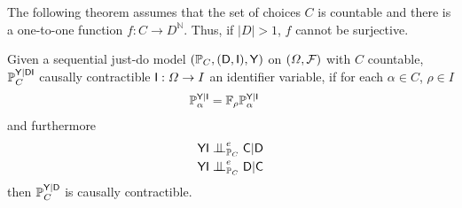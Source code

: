 The following theorem assumes that the set of choices $C$ is countable and there is a one-to-one function $f:C\to D^{\mathbb{N}}$. Thus, if $|D|>1$, $f$ cannot be surjective.

\begin{theorem}\label{th:cc_ind_treat}
Given a sequential just-do model $(\mathbb{P}_C,(\mathsf{D},\mathsf{I}),\mathsf{Y})$ on $(\Omega,\mathcal{F})$ with $C$ countable, $\mathbb{P}_C^{\mathsf{Y}|\mathsf{DI}}$ causally contractible $\mathsf{I}:\Omega\to I$ an identifier variable, if for each $\alpha\in C$, $\rho\in I$
\begin{align}
    \mathbb{P}_\alpha^{\mathsf{Y}|\mathsf{I}} &= \mathbb{F}_{\rho}\mathbb{P}_\alpha^{\mathsf{Y}|\mathsf{I}}
\end{align}
and furthermore
\begin{align}
    &\RV{YI}\CI^e_{\prob{P}_C} \RV{C}|\RV{D}\\
    &\RV{YI}\CI^e_{\prob{P}_C} \RV{D}|\RV{C}
\end{align}
then $\mathbb{P}_C^{\mathsf{Y}|\mathsf{D}}$ is causally contractible.
\end{theorem}

